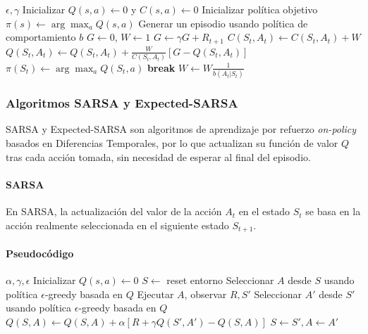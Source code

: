 \begin{algorithm}[H]
\caption{Montecarlo Off-Policy (Muestreo por Importancia) para Taxi-v3}
\begin{algorithmic}[1]
\small
\Require $\epsilon, \gamma$
\State Inicializar $Q(s, a) \gets 0$ y $C(s, a) \gets 0$
\State Inicializar política objetivo $\pi(s) \gets \arg\max_a Q(s, a)$
\State Generar un episodio usando política de comportamiento $b$ %
\State $G \gets 0$, $W \gets 1$
\State $G \gets \gamma G + R_{t+1}$
\State $C(S_t, A_t) \gets C(S_t, A_t) + W$
\State $Q(S_t, A_t) \leftarrow Q(S_t, A_t) + \frac{W}{C(S_t, A_t)} [G - Q(S_t, A_t)]$
\State $\pi(S_t) \gets \arg\max_a Q(S_t, a)$
\State \textbf{break} 
\EndIf
\State $W \gets W \frac{1}{b(A_t | S_t)}$
\EndFor
\EndFor
\end{algorithmic}
\end{algorithm}
\subsubsection{Algoritmos SARSA y Expected-SARSA}

SARSA y Expected-SARSA son algoritmos de aprendizaje por refuerzo \textit{on-policy} 
basados en Diferencias Temporales, por lo que actualizan su función de valor $Q$ tras 
cada acción tomada, sin necesidad de esperar al final del episodio.

\paragraph{SARSA}
En SARSA, la actualización del valor de la acción $A_t$ en el estado $S_t$ se basa en 
la acción realmente seleccionada en el siguiente estado $S_{t+1}$.

\paragraph{Pseudocódigo}\mbox{}
\begin{algorithm}[H]
\caption{SARSA para Taxi-v3}
\begin{algorithmic}[1]
\small
\Require $\alpha, \gamma, \epsilon$
\State Inicializar $Q(s, a) \gets 0$
\State $S \gets$ reset entorno
\State Seleccionar $A$ desde $S$ usando política $\epsilon$-greedy basada en $Q$
\State Ejecutar $A$, observar $R, S'$
\State Seleccionar $A'$ desde $S'$ usando política $\epsilon$-greedy basada en $Q$
\State $Q(S, A) \leftarrow Q(S, A) + \alpha [R + \gamma Q(S', A') - Q(S, A)]$
\State $S \gets S', A \gets A'$
\EndWhile
\EndFor
\end{algorithmic}
\end{algorithm}

